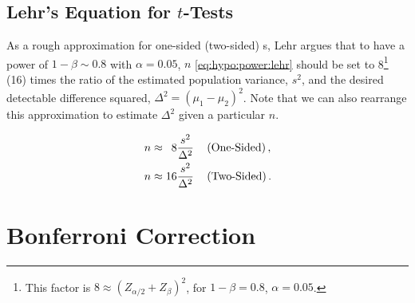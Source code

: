 
\subsection{Lehr's Equation for \texorpdfstring{$t$}{t}-Tests}
\label{hypo:power:lehr}

As a rough approximation for one-sided (two-sided) {\ttest}s,
Lehr argues that to have a power of $1-\beta \sim \num{0.8}$ with $\alpha = \num{0.05}$,
$n$ \cref{eq:hypo:power:lehr} should be set to 8\footnote{This
factor is $8 \approx \left(Z_{\alpha/2} + Z_{\beta}\right)^{2}$, for $1-\beta = \num{0.8}$, $\alpha = \num{0.05}$.} (16)
times the ratio of the estimated population variance, $s^{2}$,
and the desired detectable difference squared, $\Delta^{2} = \left(\mu_{1} - \mu_{2}\right)^{2}$.
Note that we can also rearrange this approximation to estimate $\Delta^{2}$ given a particular $n$.

\begin{subequations}\label{eq:hypo:power:lehr}
\begin{align}
n &\approx \hphantom{1}8 \frac{s^{2}}{\Delta^{2}}\quad \left(\text{One-Sided}\right), \label{eq:hypo:power:lehr:one} \\
n &\approx 16 \frac{s^{2}}{\Delta^{2}}\quad \left(\text{Two-Sided}\right). \label{eq:hypo:power:lehr:two}
\end{align}
\end{subequations}

\section{Bonferroni Correction}
\label{hypo:bonferroni_correction}

